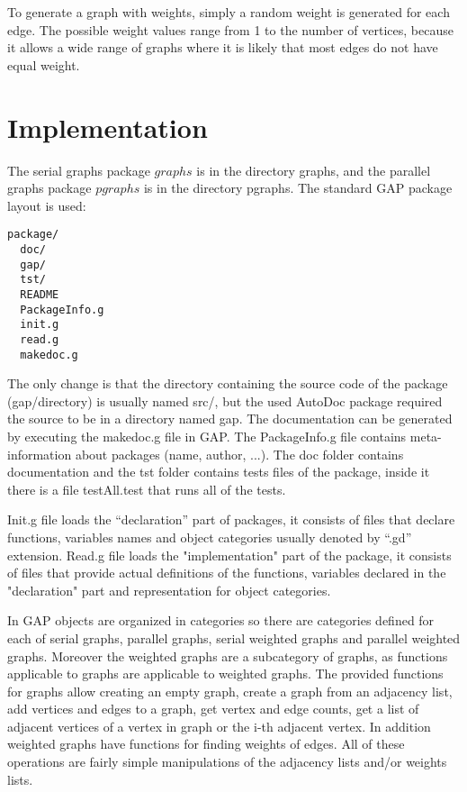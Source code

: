 \documentclass{report}
\theoremstyle{plain}
\theoremstyle{definition}
\theoremstyle{remark}
\begin{document}
To generate a graph with weights, simply a random weight is generated for each edge. The possible weight values range from 1 to the number of vertices, because it allows a wide range of graphs where it is likely that most edges do not have equal weight.

\section{Implementation}

The serial graphs package $graphs$ is in the directory graphs, and the parallel graphs package $pgraphs$ is in the directory pgraphs. The standard GAP package layout is used:

\begin{lstlisting}
package/
  doc/
  gap/
  tst/
  README
  PackageInfo.g
  init.g
  read.g
  makedoc.g
\end{lstlisting}

The only change is that the directory containing the source code of the package (gap/directory) is usually named src/, but the used AutoDoc package required the source to be in a directory named gap. The documentation can be generated by executing the makedoc.g file in GAP.
The PackageInfo.g file contains meta-information about packages (name, author, ...). The doc folder contains documentation and the tst folder contains tests files of the package, inside it there is a file testAll.test that runs all of the tests.

Init.g file loads the ``declaration'' part of packages, it consists of files that declare functions, variables names and object categories usually denoted by ``.gd'' extension. Read.g file loads the "implementation" part of the package, it consists of files that provide actual definitions of the functions, variables declared in the "declaration" part and representation for object categories.

In GAP objects are organized in categories so there are categories defined for each of serial graphs, parallel graphs, serial weighted graphs and parallel weighted graphs. Moreover the weighted graphs are a subcategory of graphs, as functions applicable to graphs are applicable to weighted graphs. The provided functions for graphs allow creating an empty graph, create a graph from an adjacency list, add vertices and edges to a graph, get vertex and edge counts, get a list of adjacent vertices of a vertex in graph or the i-th adjacent vertex. In addition weighted graphs have functions for finding weights of edges. All of these operations are fairly simple manipulations of the adjacency lists and/or weights lists.
\end{document}
